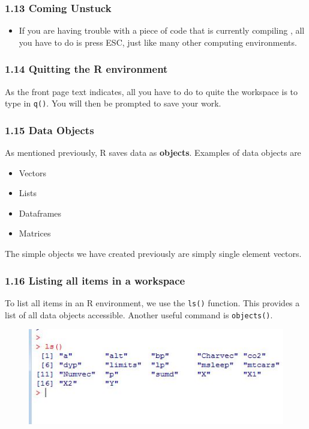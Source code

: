 \documentclass{beamer}
\begin{document}
 	\begin{frame}
 		\frametitle{1.13 Coming Unstuck}
 		\Large
 		\begin{itemize}
 			\item  If you are having trouble with a piece of code that is currently compiling , all you have to do is press ESC, just like many other computing environments.
 		\end{itemize}  
 	\end{frame}
 	\begin{frame}
 		\frametitle{1.14 Quitting the R environment}
 		As the front page text indicates, all you have to do to quite the workspace is to type in \texttt{q()}.
 		You will then be prompted to save your work.
 	\end{frame}
 	\begin{frame}
 		\frametitle{1.15 Data Objects}
 		As mentioned previously, R saves data as \textbf{objects}. Examples of data objects are
 		\begin{itemize}
 			\item Vectors
 			\item Lists
 			\item Dataframes
 			\item Matrices
 		\end{itemize}
 		The simple objects we have created previously are simply single element vectors.
 	\end{frame}
 	\begin{frame}
 		\frametitle{1.16 Listing all items in a workspace}
 		To list all items in an R environment, we use the \texttt{ls()} function. This provides a list of all data
 		objects accessible. Another useful command is \texttt{objects()}.
 		\begin{figure}
 			\centering
 			\includegraphics[width=1.2\linewidth]{images/ObjectsList}
 		\end{figure}
 		
 	\end{frame}
\end{document}
